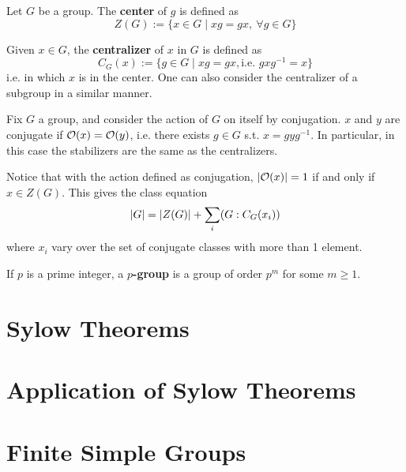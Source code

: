 \documentclass{article}
\begin{document}
\begin{definition}[Center]
    Let $G$ be a group. The \textbf{center} of $g$ is defined as
    \[
        Z(G) := \{ x \in G \mid xg = gx,\ \forall g \in G \}
    \]
\end{definition}

\begin{definition}[Centralizer]
    Given $x \in G$, the \textbf{centralizer} of $x$ in $G$ is defined as
    \[
        C_G(x) := \{ g \in G \mid xg = gx, \text{i.e. }gxg^{-1} = x \}
    \]
    i.e. in which $x$ is in the center. One can also consider the centralizer of a subgroup in a similar manner. 
\end{definition}

\begin{example}
    Fix $G$ a group, and consider the action of $G$ on itself by conjugation. $x$ and $y$ are conjugate if $\mathcal{O}(x) = \mathcal{O}(y)$, i.e. there exists $g \in G$ s.t. $x = gyg^{-1}$. In particular, in this case the stabilizers are the same as the centralizers.

    Notice that with the action defined as conjugation, $\left|\mathcal{O}(x)\right| = 1$ if and only if $x \in Z(G)$. This gives the class equation 
    \[
        \left|G\right| = \left|Z(G)\right| + \sum_i (G : C_G(x_i))
    \]
    where $x_i$ vary over the set of conjugate classes with more than 1 element. 
\end{example}

\begin{definition}[$p$-group]
    If $p$ is a prime integer, a \textbf{$p$-group} is a group of order $p^m$ for some $m \geq 1$.
\end{definition}
    
\section{Sylow Theorems}

\section{Application of Sylow Theorems}

\section{Finite Simple Groups}
\end{document}
